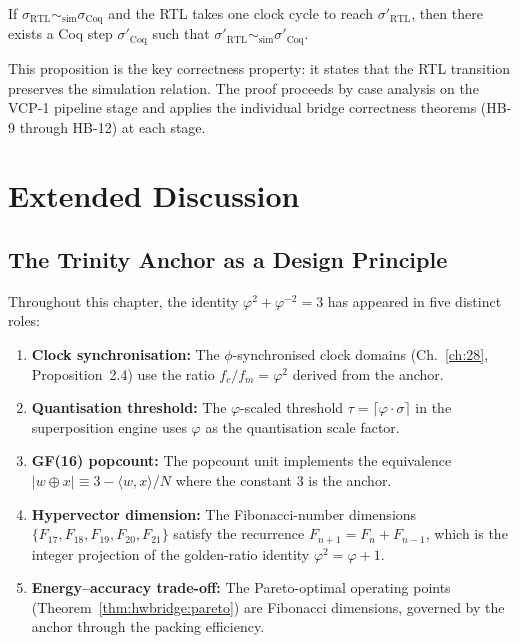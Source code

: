 \begin{proposition}
\label{prop:hwbridge:fwd-sim}
If $\sigma_{\text{RTL}} \sim_{\text{sim}} \sigma_{\text{Coq}}$ and the
RTL takes one clock cycle to reach $\sigma'_{\text{RTL}}$, then there
exists a Coq step $\sigma'_{\text{Coq}}$ such that
$\sigma'_{\text{RTL}} \sim_{\text{sim}} \sigma'_{\text{Coq}}$.
\end{proposition}

This proposition is the key correctness property: it states that the
RTL transition preserves the simulation relation. The proof proceeds by
case analysis on the VCP-1 pipeline stage and applies the individual
bridge correctness theorems (HB-9 through HB-12) at each stage.

\section{Extended Discussion}
\label{sec:hwbridge:discussion}

\subsection{The Trinity Anchor as a Design Principle}

Throughout this chapter, the identity $\varphi^2 + \varphi^{-2} = 3$ has
appeared in five distinct roles:

\begin{enumerate}
  \item \textbf{Clock synchronisation:} The $\phi$-synchronised clock domains
        (Ch.~\ref{ch:28}, Proposition~2.4) use the ratio
        $f_c/f_m = \varphi^2$ derived from the anchor.
  \item \textbf{Quantisation threshold:} The $\varphi$-scaled threshold
        $\tau = \lceil \varphi \cdot \sigma \rceil$ in the superposition
        engine uses $\varphi$ as the quantisation scale factor.
  \item \textbf{GF(16) popcount:} The popcount unit implements the
        equivalence $|w \oplus x| \equiv 3 - \langle w, x \rangle / N$
        where the constant 3 is the anchor.
  \item \textbf{Hypervector dimension:} The Fibonacci-number dimensions
        $\{F_{17}, F_{18}, F_{19}, F_{20}, F_{21}\}$ satisfy the recurrence
        $F_{n+1} = F_n + F_{n-1}$, which is the integer projection of the
        golden-ratio identity $\varphi^2 = \varphi + 1$.
  \item \textbf{Energy--accuracy trade-off:} The Pareto-optimal operating
        points (Theorem~\ref{thm:hwbridge:pareto}) are Fibonacci dimensions,
        governed by the anchor through the packing efficiency.
\end{enumerate}

